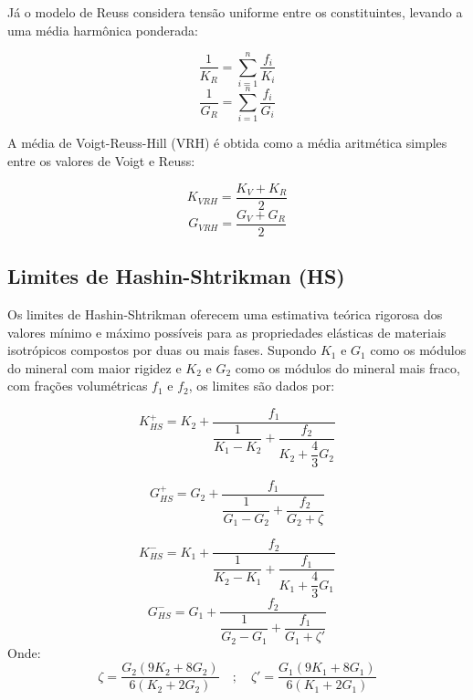 Já o modelo de Reuss considera tensão uniforme entre os constituintes, levando a uma média harmônica ponderada:

\begin{equation}
\frac{1}{K_R} = \sum_{i=1}^{n} \frac{f_i}{K_i}
\end{equation}
\begin{equation}
\frac{1}{G_R} = \sum_{i=1}^{n} \frac{f_i}{G_i}
\end{equation}

A média de Voigt-Reuss-Hill (VRH) é obtida como a média aritmética simples entre os valores de Voigt e Reuss:

\begin{equation}
K_{VRH} = \frac{K_V + K_R}{2}
\end{equation}
\begin{equation}
G_{VRH} = \frac{G_V + G_R}{2}
\end{equation}

\subsection{Limites de Hashin-Shtrikman (HS)}

Os limites de Hashin-Shtrikman oferecem uma estimativa teórica rigorosa dos valores mínimo e máximo possíveis para as propriedades elásticas de materiais isotrópicos compostos por duas ou mais fases. Supondo $K_1$ e $G_1$ como os módulos do mineral com maior rigidez e $K_2$ e $G_2$ como os módulos do mineral mais fraco, com frações volumétricas $f_1$ e $f_2$, os limites são dados por:

\begin{equation}
K_{HS}^{+} = K_2 + \frac{f_1}{\dfrac{1}{K_1 - K_2} + \dfrac{f_2}{K_2 + \dfrac{4}{3}G_2}}
\end{equation}

\begin{equation}
G_{HS}^{+} = G_2 + \frac{f_1}{\dfrac{1}{G_1 - G_2} + \dfrac{f_2}{G_2 + \zeta}}
\end{equation}

\begin{equation}
K_{HS}^{-} = K_1 + \frac{f_2}{\dfrac{1}{K_2 - K_1} + \dfrac{f_1}{K_1 + \dfrac{4}{3}G_1}}
\end{equation}
\begin{equation}
G_{HS}^{-} = G_1 + \frac{f_2}{\dfrac{1}{G_2 - G_1} + \dfrac{f_1}{G_1 + \zeta'}}
\end{equation}
Onde:
\begin{equation}
\zeta = \frac{G_2(9K_2 + 8G_2)}{6(K_2 + 2G_2)}
\quad ; \quad
\zeta' = \frac{G_1(9K_1 + 8G_1)}{6(K_1 + 2G_1)}
\end{equation}

